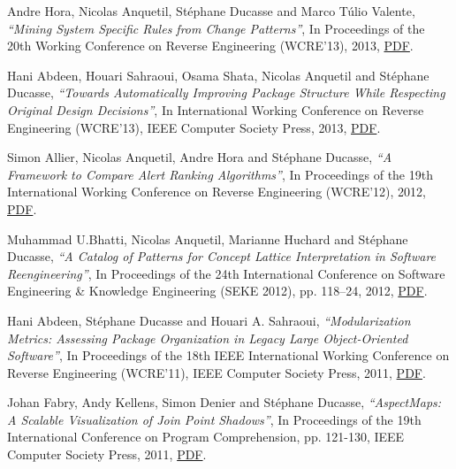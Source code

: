 \documentclass{article}
\newcommand{\czauthors}[1]{#1}
\newcommand{\cztitle}[1]{\emph{``#1''}}
\newcommand{\czbooktitle}[1]{#1}
\begin{document}
\begin{itemize}
	\pub  \czauthors{Andre Hora, Nicolas Anquetil, St\'ephane Ducasse and Marco T\'ulio Valente},  \cztitle{Mining System Specific Rules from Change Patterns},  In \czbooktitle{Proceedings of the 20th Working Conference on Reverse Engineering (WCRE'13)}, 2013, \href{http://rmod-files.lille.inria.fr/Team/Texts/Papers/Hora13a-MinedRules-WCRE13.pdf}{PDF}.

	\pub  \czauthors{Hani Abdeen, Houari Sahraoui, Osama Shata, Nicolas Anquetil and St\'ephane Ducasse},  \cztitle{Towards Automatically Improving Package Structure While Respecting Original Design Decisions},  In \czbooktitle{International Working Conference on Reverse Engineering (WCRE'13)}, IEEE Computer Society Press, 2013, \href{http://rmod-files.lille.inria.fr/Team/Texts/Papers/Abde13a-ImprovingPackageStructure-WCRE13.pdf}{PDF}.

	\pub  \czauthors{Simon Allier, Nicolas Anquetil, Andre Hora and St\'ephane Ducasse},  \cztitle{A Framework to Compare Alert Ranking Algorithms},  In \czbooktitle{Proceedings of the 19th International Working Conference on Reverse Engineering (WCRE'12)}, 2012, \href{http://rmod-files.lille.inria.fr/Team/Texts/Papers/Alli12a-wcre2012-ComparisonOfAlertsRankingAlgorithms.pdf}{PDF}.

	\pub  \czauthors{Muhammad U.Bhatti, Nicolas Anquetil, Marianne Huchard and St\'ephane Ducasse},  \cztitle{A Catalog of Patterns for Concept Lattice Interpretation in Software Reengineering},  In \czbooktitle{Proceedings of the 24th International Conference on Software Engineering \& Knowledge Engineering (SEKE 2012)}, pp. 118--24, 2012, \href{http://rmod-files.lille.inria.fr/Team/Texts/Papers/Bhat12c-SEKE2012-FCA-patterns.pdf}{PDF}.

	\pub  \czauthors{Hani Abdeen, St\'ephane Ducasse and Houari A. Sahraoui},  \cztitle{Modularization Metrics: Assessing Package Organization in Legacy Large Object-Oriented Software},  In \czbooktitle{Proceedings of the 18th IEEE International Working Conference on Reverse Engineering (WCRE'11)}, IEEE Computer Society Press, 2011, \href{http://rmod-files.lille.inria.fr/Team/Texts/Papers/Abde11a-WCRE-ModularizationMetrics-INRIA.pdf}{PDF}.

	\pub  \czauthors{Johan Fabry, Andy Kellens, Simon Denier and St\'ephane Ducasse},  \cztitle{{AspectMaps}: A Scalable Visualization of Join Point Shadows},  In \czbooktitle{Proceedings of the 19th International Conference on Program Comprehension}, pp. 121-130, IEEE Computer Society Press, 2011, \href{http://rmod-files.lille.inria.fr/Team/Texts/Papers/Fabr11a-ICPC2011-AspectMaps.pdf}{PDF}.


\end{itemize}
\end{document}
